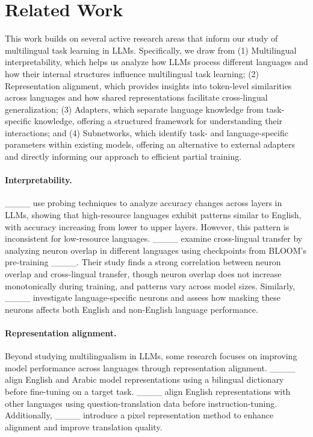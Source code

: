 \section{Related Work}
This work builds on several active research areas that inform our study of multilingual task learning in LLMs. Specifically, we draw from (1) Multilingual interpretability, which helps us analyze how LLMs process different languages and how their internal structures influence multilingual task learning; (2) Representation alignment, which provides insights into token-level similarities across languages and how shared representations facilitate cross-lingual generalization; (3) Adapters, which separate language knowledge from task-specific knowledge, offering a structured framework for understanding their interactions; and (4) Subnetworks, which identify task- and language-specific parameters within existing models, offering an alternative to external adapters and directly informing our approach to efficient partial training.  


\paragraph{Interpretability.}
____ use probing techniques to analyze accuracy changes across layers in LLMs, showing that high-resource languages exhibit patterns similar to English, with accuracy increasing from lower to upper layers. However, this pattern is inconsistent for low-resource languages. ____ examine cross-lingual transfer by analyzing neuron overlap in different languages using checkpoints from BLOOM’s pre-training ____. Their study finds a strong correlation between neuron overlap and cross-lingual transfer, though neuron overlap does not increase monotonically during training, and patterns vary across model sizes. Similarly, ____ investigate language-specific neurons and assess how masking these neurons affects both English and non-English language performance.   


\paragraph{Representation alignment.}

Beyond studying multilingualism in LLMs, some research focuses on improving model performance across languages through representation alignment. ____ align English and Arabic model representations using a bilingual dictionary before fine-tuning on a target task. ____ align English representations with other languages using question-translation data before instruction-tuning. Additionally, ____ introduce a pixel representation method to enhance alignment and improve translation quality.   



